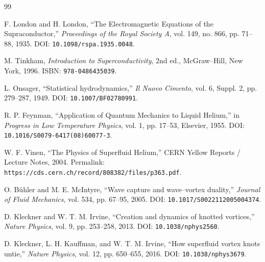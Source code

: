         \ifresearchtrackincluded\else
\begin{thebibliography}{99}
            
            F. London and H. London,
            ``The Electromagnetic Equations of the Supraconductor,''
            \textit{Proceedings of the Royal Society A},
            vol. 149, no. 866, pp. 71--88, 1935.
            DOI: \texttt{10.1098/rspa.1935.0048}.
            
            M. Tinkham,
            \textit{Introduction to Superconductivity},
            2nd ed.,
            McGraw--Hill, New York, 1996.
            ISBN: \texttt{978-0486435039}.
            
            L. Onsager,
            ``Statistical hydrodynamics,''
            \textit{Il Nuovo Cimento},
            vol. 6, Suppl. 2, pp. 279--287, 1949.
            DOI: \texttt{10.1007/BF02780991}.
            
            R. P. Feynman,
            ``Application of Quantum Mechanics to Liquid Helium,''
            in \textit{Progress in Low Temperature Physics},
            vol. 1, pp. 17--53, Elsevier, 1955.
            DOI: \texttt{10.1016/S0079-6417(08)60077-3}.
            
            W. F. Vinen,
            ``The Physics of Superfluid Helium,''
            CERN Yellow Reports / Lecture Notes, 2004.
            Permalink: \texttt{https://cds.cern.ch/record/808382/files/p363.pdf}.
            
            O. B{\"u}hler and M. E. McIntyre,
            ``Wave capture and wave--vortex duality,''
            \textit{Journal of Fluid Mechanics},
            vol. 534, pp. 67--95, 2005.
            DOI: \texttt{10.1017/S0022112005004374}.
            
            D. Kleckner and W. T. M. Irvine,
            ``Creation and dynamics of knotted vortices,''
            \textit{Nature Physics},
            vol. 9, pp. 253--258, 2013.
            DOI: \texttt{10.1038/nphys2560}.
            
            D. Kleckner, L. H. Kauffman, and W. T. M. Irvine,
            ``How superfluid vortex knots untie,''
            \textit{Nature Physics},
            vol. 12, pp. 650--655, 2016.
            DOI: \texttt{10.1038/nphys3679}.
            

\end{thebibliography}
